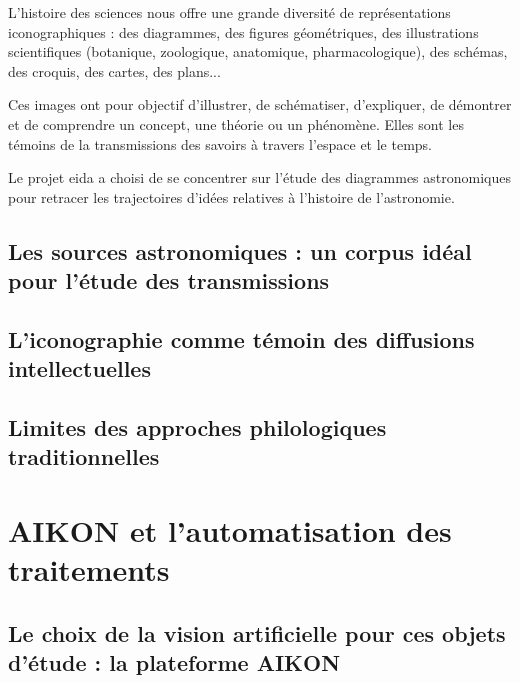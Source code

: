\documentclass[a4paper,12pt,twoside]{book}
\newcommand{\clearemptydoublepage}{\newpage{\pagestyle{empty}\cleardoublepage}}
\begin{document}
	L'histoire des sciences nous offre une grande diversité de représentations iconographiques : des diagrammes, des figures géométriques, des illustrations scientifiques (botanique, zoologique, anatomique, pharmacologique), des schémas, des croquis, des cartes, des plans...
	
	Ces images ont pour objectif d'illustrer, de schématiser, d'expliquer, de démontrer et de comprendre un concept, une théorie ou un phénomène. Elles sont les témoins de la transmissions des savoirs à travers l'espace et le temps.
	
	Le projet \gls{eida} a choisi de se concentrer sur l'étude des diagrammes astronomiques pour retracer les trajectoires d'idées relatives à l'histoire de l'astronomie. 
	
	\section[Un corpus idéal pour l'étude des transmissions]{Les sources astronomiques : un corpus idéal pour l'étude des transmissions}
	

	
	
	
	\section[L'iconographie témoin des diffusions intellectuelles]{L'iconographie comme témoin des diffusions intellectuelles}


	


	
	\section{Limites des approches philologiques traditionnelles}
	
	
	
	
	\clearemptydoublepage
	
	\chapter{AIKON et l'automatisation des traitements}
	
	\section[La plateforme AIKON]{Le choix de la vision artificielle pour ces objets d'étude : la plateforme AIKON}
	
\end{document}
